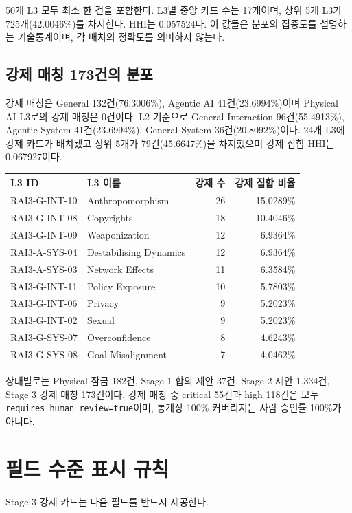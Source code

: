 \documentclass[11pt,a4paper]{article}
\newcommand{\code}[1]{\texttt{#1}}
\begin{document}
50개 L3 모두 최소 한 건을 포함한다. L3별 중앙 카드 수는 17개이며,
상위 5개 L3가 725개(42.0046\%)를 차지한다. HHI는 0.057524다.
이 값들은 분포의 집중도를 설명하는 기술통계이며, 각 배치의 정확도를 의미하지 않는다.

\subsection{강제 매칭 173건의 분포}

강제 매칭은 General 132건(76.3006\%), Agentic AI 41건(23.6994\%)이며
Physical AI L3로의 강제 매칭은 0건이다. L2 기준으로 General Interaction
96건(55.4913\%), Agentic System 41건(23.6994\%), General System
36건(20.8092\%)이다. 24개 L3에 강제 카드가 배치됐고 상위 5개가
79건(45.6647\%)을 차지했으며 강제 집합 HHI는 0.067927이다.

\begin{longtable}{llrr}
\toprule
L3 ID & L3 이름 & 강제 수 & 강제 집합 비율 \\
\midrule
\endhead
RAI3-G-INT-10 & Anthropomorphism & 26 & 15.0289\% \\
RAI3-G-INT-08 & Copyrights & 18 & 10.4046\% \\
RAI3-G-INT-09 & Weaponization & 12 & 6.9364\% \\
RAI3-A-SYS-04 & Destabilising Dynamics & 12 & 6.9364\% \\
RAI3-A-SYS-03 & Network Effects & 11 & 6.3584\% \\
RAI3-G-INT-11 & Policy Exposure & 10 & 5.7803\% \\
RAI3-G-INT-06 & Privacy & 9 & 5.2023\% \\
RAI3-G-INT-02 & Sexual & 9 & 5.2023\% \\
RAI3-G-SYS-07 & Overconfidence & 8 & 4.6243\% \\
RAI3-G-SYS-08 & Goal Misalignment & 7 & 4.0462\% \\
\bottomrule
\end{longtable}

상태별로는 Physical 잠금 182건, Stage 1 합의 제안 37건, Stage 2 제안
1,334건, Stage 3 강제 매칭 173건이다. 강제 매칭 중 critical 55건과 high
118건은 모두 \code{requires\_human\_review=true}이며, 통계상 100\% 커버리지는
사람 승인률 100\%가 아니다.

\section{필드 수준 표시 규칙}

Stage 3 강제 카드는 다음 필드를 반드시 제공한다.
\end{document}
